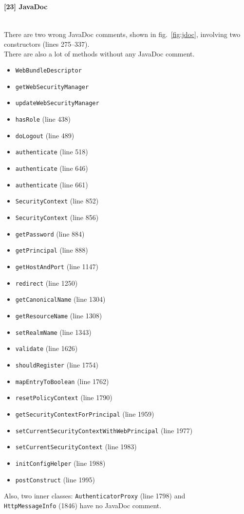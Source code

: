 \documentclass[a4paper, 11pt]{article}
\newcommand{\code}[1]{\texttt{#1}}
\newcommand{\issue}[3][?]{
    \paragraph{[#1] #2} \mbox{}\\ #3
}
\begin{document}
\issue[23]{JavaDoc} {
    There are two wrong JavaDoc comments, shown in fig.~\ref{fig:jdoc}, 
    involving two constructors (lines 275--337). \\
    There are also a lot of methods without any JavaDoc comment.
    \begin{itemize}
    \item \code{WebBundleDescriptor}
    \item \code{getWebSecurityManager}
    \item \code{updateWebSecurityManager}
    \item \code{hasRole} (line 438)
    \item \code{doLogout} (line 489) 
    \item \code{authenticate} (line 518)
    \item \code{authenticate} (line 646)
    \item \code{authenticate} (line 661)
    \item \code{SecurityContext} (line 852)
    \item \code{SecurityContext} (line 856)
    \item \code{getPassword} (line 884) 
    \item \code{getPrincipal} (line 888)
    \item \code{getHostAndPort} (line 1147) 
    \item \code{redirect} (line 1250)
    \item \code{getCanonicalName} (line 1304) 
    \item \code{getResourceName} (line 1308)
    \item \code{setRealmName} (line 1343) 
    \item \code{validate} (line 1626)
    \item \code{shouldRegister} (line 1754) 
    \item \code{mapEntryToBoolean} (line 1762)
    \item \code{resetPolicyContext} (line 1790) 
    \item \code{getSecurityContextForPrincipal} (line 1959)
    \item \code{setCurrentSecurityContextWithWebPrincipal} (line 1977)
    \item \code{setCurrentSecurityContext} (line 1983)
    \item \code{initConfigHelper} (line 1988)
    \item \code{postConstruct} (line 1995)
    \end{itemize}
    
    Also, two inner classes: 
    \code{AuthenticatorProxy} (line 1798) and \\
    \code{HttpMessageInfo} (1846) have no JavaDoc comment.
}
\end{document}
